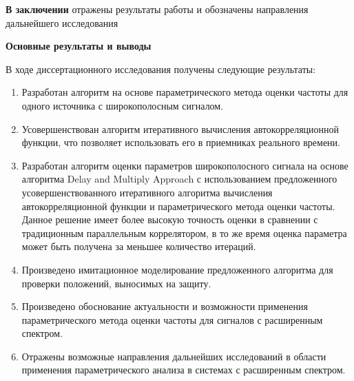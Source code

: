 
{\bf{В заключении}}
отражены результаты работы и обозначены направления дальнейшего исследования

\noindent\centerline{\bf{Основные результаты и выводы}}
В ходе диссертационного исследования получены следующие результаты:
\begin{enumerate}
\item Разработан алгоритм на основе параметрического метода оценки частоты для одного источника с широкополосным сигналом.
\item Усовершенствован алгоритм итеративного вычисления автокорреляционной функции, что позволяет использовать его в приемниках
	реального времени.
\item Разработан алгоритм оценки параметров широкополосного сигнала на основе алгоритма Delay and Multiply Approach с использованием
	предложенного усовершенствованного итеративного алгоритма вычисления автокорреляционной функции и параметрического
	метода оценки частоты. Данное решение имеет более высокую точность оценки в сравнении с традиционным
	параллельным коррелятором, в то же время оценка параметра может быть получена за меньшее количество итераций.
\item Произведено имитационное моделирование предложенного алгоритма для проверки положений, выносимых на защиту.
\item Произведено обоснование актуальности и возможности применения параметрического метода оценки частоты для сигналов
	с расширенным спектром.
\item Отражены возможные направления дальнейших исследований в области применения параметрического анализа в системах
	с расширенным спектром.
\end{enumerate}

